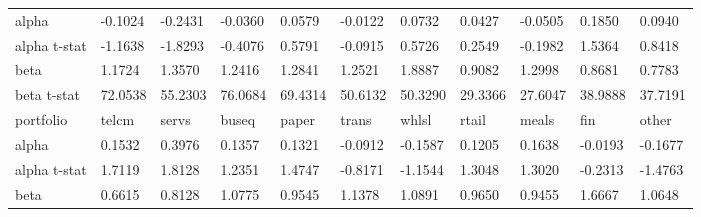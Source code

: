 \documentclass{report}
\begin{document}
\begin{table}[H]
\begin{tabular}{@{}|l|llllllllll@{}}
alpha        & -0.1024                    & -0.2431                    & -0.0360                    & 0.0579                     & -0.0122                    & 0.0732                     & 0.0427                     & -0.0505                    & 0.1850                     & 0.0940                     \\ \cmidrule(r){1-1}
alpha t-stat & -1.1638                    & -1.8293                    & -0.4076                    & 0.5791                     & -0.0915                    & 0.5726                     & 0.2549                     & -0.1982                    & 1.5364                     & 0.8418                     \\ \cmidrule(r){1-1}
beta         & 1.1724                     & 1.3570                     & 1.2416                     & 1.2841                     & 1.2521                     & 1.8887                     & 0.9082                     & 1.2998                     & 0.8681                     & 0.7783                     \\ \cmidrule(r){1-1}
beta t-stat  & 72.0538                    & 55.2303                    & 76.0684                    & 69.4314                    & 50.6132                    & 50.3290                    & 29.3366                    & 27.6047                    & 38.9888                    & 37.7191                    \\ \midrule
portfolio    & \multicolumn{1}{l|}{telcm} & \multicolumn{1}{l|}{servs} & \multicolumn{1}{l|}{buseq} & \multicolumn{1}{l|}{paper} & \multicolumn{1}{l|}{trans} & \multicolumn{1}{l|}{whlsl} & \multicolumn{1}{l|}{rtail} & \multicolumn{1}{l|}{meals} & \multicolumn{1}{l|}{fin}   & \multicolumn{1}{l|}{other} \\ \midrule
alpha        & 0.1532                     & 0.3976                     & 0.1357                     & 0.1321                     & -0.0912                    & -0.1587                    & 0.1205                     & 0.1638                     & -0.0193                    & -0.1677                    \\ \cmidrule(r){1-1}
alpha t-stat & 1.7119                     & 1.8128                     & 1.2351                     & 1.4747                     & -0.8171                    & -1.1544                    & 1.3048                     & 1.3020                     & -0.2313                    & -1.4763                    \\ \cmidrule(r){1-1}
beta         & 0.6615                     & 0.8128                     & 1.0775                     & 0.9545                     & 1.1378                     & 1.0891                     & 0.9650                     & 0.9455                     & 1.6667                     & 1.0648                     \\ \cmidrule(r){1-1}

\end{tabular}
\end{table}
\end{document}
